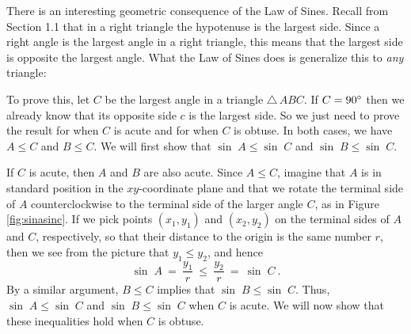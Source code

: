 There is an interesting geometric consequence of the Law of Sines. Recall from Section 1.1 that in
a right triangle the hypotenuse is the largest side. Since a right angle is the largest angle in a
right triangle, this means that the largest side is opposite the largest angle. What the Law of
Sines does is generalize this to \emph{any} triangle:

\begin{center}\end{center}

To prove this, let $C$ be the largest angle in a triangle $\triangle\,ABC$.
If $C = 90^\circ$ then we already know that its opposite side $c$ is the largest
side. So we just need to prove the result for when $C$ is acute and for when $C$ is obtuse.
In both cases, we have $A \le C$ and $B \le C$. We will first show that $\sin\;A \le \sin\;C$ and
$\sin\;B \le \sin\;C$.

\piccaption[]{\label{fig:sinasinc}}
If $C$ is acute, then $A$ and $B$ are also acute. Since $A \le C$, imagine
that $A$ is in standard position in the $xy$-coordinate plane and that we rotate the terminal side
of $A$ counterclockwise to the terminal side of the larger angle $C$, as in Figure
\ref{fig:sinasinc}. If we pick points $(x_{1},y_{1})$ and $(x_{2},y_{2})$ on the terminal sides of
$A$ and $C$, respectively, so that their distance to the origin is the same number $r$, then we see
from the picture that $y_{1} \le y_{2}$, and hence
\begin{displaymath}
 \sin\;A ~=~ \frac{y_{1}}{r} ~\le~ \frac{y_{2}}{r} ~=~ \sin\;C ~.
\end{displaymath}
By a similar argument, $B \le C$ implies that $\sin\;B \le \sin\;C$. Thus, $\sin\;A \le \sin\;C$ and
$\sin\;B \le \sin\;C$ when $C$ is acute. We will now show that these inequalities hold when $C$ is
obtuse.

